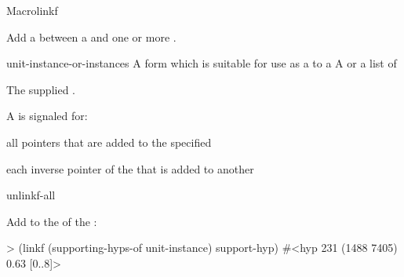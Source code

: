 \documentclass[10pt,twoside,english,pdftex]{article}
\begin{document}
\begin{functiondoc}{Macro}{linkf}%
 {
   \returns{} } 
%
%

\fnsyntax

\fnpurpose Add a  between a  and one
or more .

\fnpackage {}

\fnmodule {}

\fnargs
\begin{args}{unit-instance-or-instances}
 A form which is suitable for use as a
 to a 
 A  or a
list of 
\end{args}

\fnreturns The supplied .

\fnevents
{}%
%
%
%
%
%
A  is signaled for:
\begin{tightitemize}
\item all pointers that are added to the specified
\item  each inverse pointer of the  that is added to
  another 
\end{tightitemize}

\begin{alsos}{unlinkf-all}
\also[unlinkf]
\end{alsos}

\fnexample Add  to the 
 of the  
:
%
\W\supp
\begin{example}
> (linkf (supporting-hyps-of unit-instance) support-hyp)
#<hyp 231 (1488 7405) 0.63 [0..8]>
\end{example}

\end{functiondoc}

\end{document}

